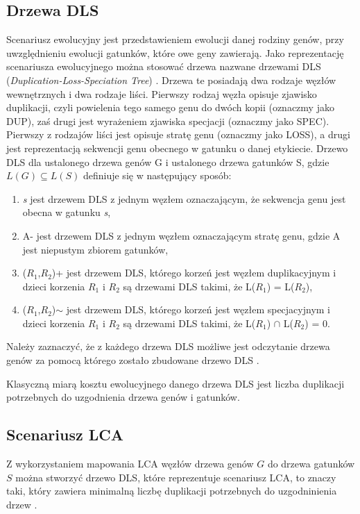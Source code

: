 \documentclass[licencjacka]{pracamgr}
\begin{document}
\subsection{Drzewa DLS}

Scenariusz ewolucyjny jest przedstawieniem ewolucji danej rodziny genów, przy uwzględnieniu ewolucji gatunków, które owe geny zawierają. Jako reprezentację scenariusza ewolucyjnego można stosować drzewa nazwane drzewami DLS (\textit{Duplication-Loss-Speciation Tree}) \cite{dls}. Drzewa te posiadają dwa rodzaje węzłów wewnętrznych i dwa rodzaje liści. Pierwszy rodzaj węzła opisuje zjawisko duplikacji, czyli powielenia tego samego genu do dwóch kopii (oznaczmy jako DUP), zaś drugi jest wyrażeniem zjawiska specjacji (oznaczmy jako SPEC). Pierwszy z rodzajów liści jest opisuje stratę genu (oznaczmy jako LOSS), a drugi jest reprezentacją sekwencji genu obecnego w gatunku o danej etykiecie. Drzewo DLS dla ustalonego drzewa genów G i ustalonego drzewa gatunków S, gdzie $L(G) \subseteq L(S)$ definiuje się w następujący sposób:

\begin{enumerate}
\item \textit{s} jest drzewem DLS z jednym węzłem oznaczającym, że sekwencja genu jest obecna w gatunku \textit{s},
\item  A- jest drzewem DLS z jednym węzłem oznaczającym stratę genu, gdzie A jest niepustym zbiorem gatunków,
\item ($R_1$,$R_2$)+ jest drzewem DLS, którego korzeń jest węzłem duplikacyjnym i dzieci korzenia $R_1$ i $R_2$ są drzewami DLS takimi, że L($R_1$) = L($R_2$),
\item ($R_1$,$R_2$)$\sim$ jest drzewem DLS, którego korzeń jest węzłem specjacyjnym i dzieci korzenia $R_1$ i $R_2$ są drzewami DLS takimi, że L($R_1$) $\cap$ L($R_2$) = 0.
\end{enumerate}

Należy zaznaczyć, że z każdego drzewa DLS możliwe jest odczytanie drzewa genów za pomocą którego zostało zbudowane drzewo DLS \cite{dls}.

Klasyczną miarą kosztu ewolucyjnego danego drzewa DLS jest liczba duplikacji potrzebnych do uzgodnienia drzewa genów i gatunków.

\subsection{Scenariusz LCA}

Z wykorzystaniem mapowania LCA węzłów drzewa genów $G$ do drzewa gatunków $S$ można stworzyć drzewo DLS, które reprezentuje scenariusz LCA, to znaczy taki, który zawiera minimalną liczbę duplikacji potrzebnych do uzgodninienia drzew \cite{dowod}.
\end{document}
